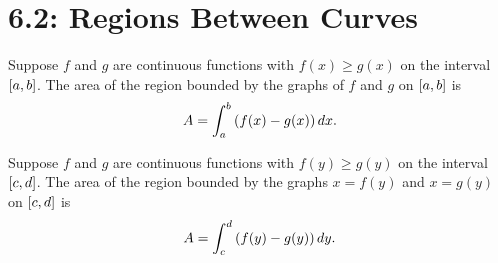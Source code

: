 \documentclass[../mathNotesPreamble]{subfiles}
\begin{document}
  \section*{6.2: Regions Between Curves}

  \begin{defn*}
    Suppose $f$ and $g$ are continuous functions with $f(x)\geq g(x)$ on the interval ${\left[a,b\right]}$. The area of the region bounded by the graphs of $f$ and $g$ on ${\left[a,b\right]}$ is
      \[A=\int_a^b {\left(f(x)-g(x)\right)}\,dx.\]
  \end{defn*}

  \begin{defn*}
    Suppose $f$ and $g$ are continuous functions with $f(y)\geq g(y)$ on the interval ${\left[c,d\right]}$. The area of the region bounded by the graphs $x=f(y)$ and $x=g(y)$ on ${\left[c,d\right]}$ is
      \[A=\int_c^d {\left(f(y)-g(y)\right)}\,dy.\]
  \end{defn*}
\end{document}
